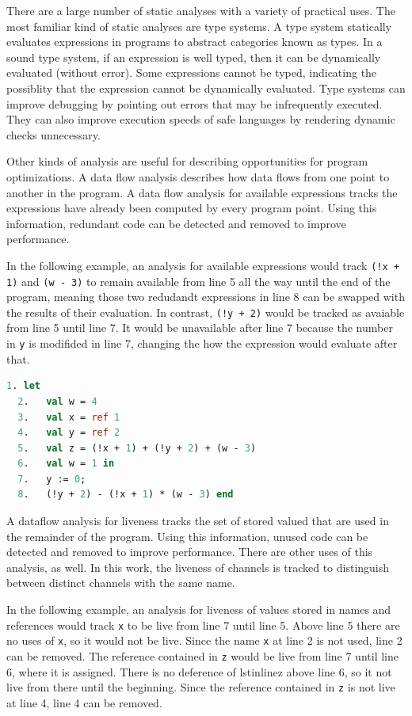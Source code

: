 \documentclass{article}
\begin{document}
There are a large number of static analyses with a variety of practical uses. The most familiar
kind of static analyses are type systems.  A type system statically evaluates expressions
in programs to abstract categories known as types. In a sound type system, if an expression is
well typed, then it can be dynamically evaluated (without error). Some expressions cannot be
typed, indicating the possiblity that the expression cannot be dynamically evaluated. Type
systems can improve debugging by pointing out errors that may be infrequently executed. They
can also improve execution speeds of safe languages by rendering dynamic checks unnecessary.  

Other kinds of analysis are useful for describing opportunities for program optimizations.
A data flow analysis describes how data flows from one point to another in the program.
A data flow analysis for available expressions tracks the expressions have already been
computed by every program point. Using this information, redundant code can be detected and
removed to improve performance.

In the following example, an analysis for available expressions would track
\lstinline{(!x + 1)} and \lstinline{(w - 3)} to remain available from line 5 all the way until
the end of the program, meaning those two redudandt expressions in line 8 can be swapped with
the results of their evaluation. In contrast, \lstinline{(!y + 2)} would be tracked as avaiable
from line 5 until line 7. It would be unavailable after line 7 because the number in
\lstinline{y} is modifided in line 7, changing the how the expression would evaluate after
that.

\begin{lstlisting}[language=ML, escapechar=\%]
  1. let
  2.   val w = 4
  3.   val x = ref 1
  4.   val y = ref 2
  5.   val z = (!x + 1) + (!y + 2) + (w - 3)
  6.   val w = 1 in
  7.   y := 0;
  8.   (!y + 2) - (!x + 1) * (w - 3) end
  \end{lstlisting}



A dataflow analysis for liveness tracks the set of stored valued that are used in the
remainder of the program. Using this information, unused code can
be detected and removed to improve performance. There are other uses of this analysis, as well.
In this work, the liveness of channels is tracked to distinguish between distinct channels with
the same name. 

In the following example, an analysis for liveness of values stored in names and references
would track \lstinline{x} to be live from line 7 until line 5. Above line 5 there are no uses
of \lstinline{x}, so it would not be live. Since the name \lstinline{x} at line 2 is not used,
line 2 can be removed. The reference contained in \lstinline{z} would be
live from line 7 until line 6, where it is assigned. There is no deference of lstinline{z}
above line 6, so it not live from there until the beginning. Since the reference contained in
\lstinline{z} is not live at line 4, line 4 can be removed.
\end{document}
